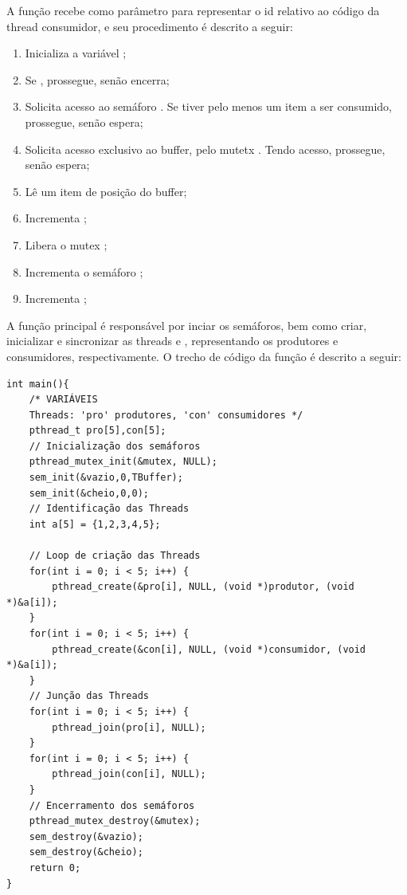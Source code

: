 \documentclass[
	12pt,				%
	openright,			%
	oneside,			%
	a4paper,			%
	chapter=TITLE,		%
	english,			%
	french,				%
	spanish,			%
	brazil				%
	]{abntex2}
\theoremstyle{definition}
\begin{document}
A função recebe  como parâmetro para representar o id relativo ao código da thread consumidor, e seu procedimento é descrito a seguir:
\begin{enumerate}
    \item Inicializa a variável ;
    \item Se , prossegue, senão encerra;
    \item Solicita acesso ao semáforo . Se tiver pelo menos um item a ser consumido, prossegue, senão espera;
    \item Solicita acesso exclusivo ao buffer, pelo mutetx . Tendo acesso, prossegue, senão espera;
    \item Lê um item de posição  do buffer;
    \item Incrementa ;
    \item Libera o mutex ;
    \item Incrementa o semáforo ;
    \item Incrementa ;
\end{enumerate}

A função principal  é responsável por inciar os semáforos, bem como criar, inicializar e sincronizar as threads  e , representando os produtores e consumidores, respectivamente. O trecho de código  da função  é descrito a seguir:

\begin{verbatim}
int main(){
    /* VARIÁVEIS 
    Threads: 'pro' produtores, 'con' consumidores */
    pthread_t pro[5],con[5];
    // Inicialização dos semáforos
    pthread_mutex_init(&mutex, NULL);
    sem_init(&vazio,0,TBuffer);
    sem_init(&cheio,0,0);
    // Identificação das Threads
    int a[5] = {1,2,3,4,5};

    // Loop de criação das Threads
    for(int i = 0; i < 5; i++) {
        pthread_create(&pro[i], NULL, (void *)produtor, (void *)&a[i]);
    }
    for(int i = 0; i < 5; i++) {
        pthread_create(&con[i], NULL, (void *)consumidor, (void *)&a[i]);
    }
    // Junção das Threads
    for(int i = 0; i < 5; i++) {
        pthread_join(pro[i], NULL);
    }
    for(int i = 0; i < 5; i++) {
        pthread_join(con[i], NULL);
    }
    // Encerramento dos semáforos
    pthread_mutex_destroy(&mutex);
    sem_destroy(&vazio);
    sem_destroy(&cheio);
    return 0;
}
\end{verbatim}
\end{document}

